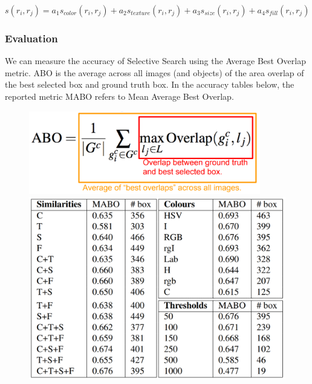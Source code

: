 \documentclass{article}
\begin{document}
\[s(r_i, r_j) = a_1s_{color}(r_i, r_j) + a_2s_{texture}(r_i, r_j) + a_3s_{size}(r_i, r_j) + a_4s_{fill}(r_i, r_j)\]

\subsubsection{Evaluation}
We can measure the accuracy of Selective Search using the Average Best Overlap metric. ABO is the average across all images (and objects) of the area overlap of the best selected box and ground truth box. In the accuracy tables below, the reported metric MABO refers to Mean Average Best Overlap.

\begin{figure}[htbp]
    \centering
    \begin{minipage}{0.4\textwidth}
        \centering
        \includegraphics[width=0.9\textwidth]{abo.PNG} %
    \end{minipage}\hfill
    \begin{minipage}{0.6\textwidth}
        \centering
        \includegraphics[width=1\textwidth]{results.PNG} %
    \end{minipage}
\end{figure}
\end{document}
